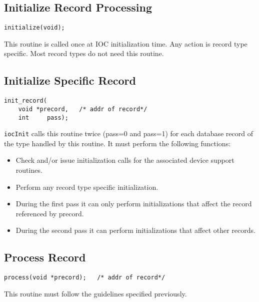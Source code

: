 \subsection{Initialize Record Processing}

\begin{verbatim}
initialize(void);
\end{verbatim}

This routine is called once at IOC initialization time.
Any action is record type specific.
Most record types do not need this routine.

\subsection{Initialize Specific Record}

\begin{verbatim}
init_record(
    void *precord,   /* addr of record*/
    int     pass);
\end{verbatim}

\verb|iocInit| calls this routine twice (pass=0 and pass=1) for each database record of the type handled by this routine.
It must perform the following functions:

\begin{itemize}
\item Check and/or issue initialization calls for the associated device support routines.

\item Perform any record type specific initialization.

\item During the first pass it can only perform initializations that affect the record referenced by precord.

\item During the second pass it can perform initializations that affect other records.

\end{itemize}

\subsection{Process Record}

\begin{verbatim}
process(void *precord);   /* addr of record*/
\end{verbatim}

This routine must follow the guidelines specified previously.


